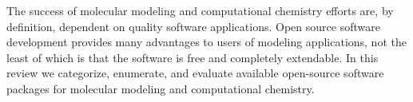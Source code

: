 The success of molecular modeling and computational chemistry efforts are, by definition, dependent on quality software applications. Open source software development provides many advantages to users of modeling applications, not the least of which is that the software is free and completely extendable.  In this review we categorize, enumerate, and evaluate available open-source software packages for molecular modeling and computational chemistry.